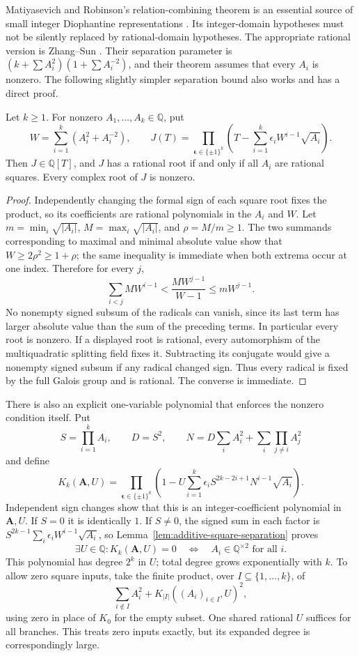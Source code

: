Matiyasevich and Robinson's relation-combining theorem is an essential
source of small integer Diophantine representations
\cite{MatiyasevichRobinson1975,Jones1982}. Its integer-domain hypotheses
must not be silently replaced by rational-domain hypotheses. The
appropriate rational version is Zhang--Sun
\cite[Theorem 1.2]{ZhangSun2022}. Their separation parameter is
$(k+\sum A_i^2)(1+\sum A_i^{-2})$, and their theorem assumes that every
$A_i$ is nonzero. The following slightly simpler separation bound also
works and has a direct proof.

\begin{lemma}\label{lem:additive-square-separation}
Let $k\ge1$. For nonzero $A_1,\ldots,A_k\in\mathbb Q$, put
\[
 W=\sum_{i=1}^k(A_i^2+A_i^{-2}),\qquad
 J(T)=\prod_{\boldsymbol\epsilon\in\{\pm1\}^k}
 \left(T-\sum_{i=1}^k\epsilon_i W^{i-1}\sqrt{A_i}\right).
\]
Then $J\in\mathbb Q[T]$, and $J$ has a rational root if and only if
all $A_i$ are rational squares. Every complex root of $J$ is nonzero.
\end{lemma}
\begin{proof}
Independently changing the formal sign of each square root fixes the
product, so its coefficients are rational polynomials in the $A_i$ and
$W$. Let
$m=\min_i\sqrt{|A_i|}$, $M=\max_i\sqrt{|A_i|}$, and $\rho=M/m\ge1$.
The two summands corresponding to maximal and minimal absolute value
show that $W\ge2\rho^2\ge1+\rho$; the same inequality is immediate
when both extrema occur at one index. Therefore for every $j$,
\[
 \sum_{i<j}M W^{i-1}<\frac{M W^{j-1}}{W-1}
 \le mW^{j-1}.
\]
No nonempty signed subsum of the radicals can vanish, since its last
term has larger absolute value than the sum of the preceding terms.
In particular every root is nonzero. If a displayed root is rational,
every automorphism of the multiquadratic splitting field fixes it.
Subtracting its conjugate would give a nonempty signed subsum if any
radical changed sign. Thus every radical is fixed by the full Galois
group and is rational. The converse is immediate.
\end{proof}

There is also an explicit one-variable polynomial that enforces the
nonzero condition itself. Put
\[
 S=\prod_{i=1}^k A_i,\qquad D=S^2,\qquad
 N=D\sum_i A_i^2+\sum_i\prod_{j\ne i}A_j^2
\]
and define
\[
 K_k(\mathbf A,U)=\prod_{\boldsymbol\epsilon\in\{\pm1\}^k}
 \left(1-U\sum_{i=1}^k\epsilon_i
 S^{2k-2i+1}N^{i-1}\sqrt{A_i}\right).
\]
Independent sign changes show that this is an integer-coefficient
polynomial in $\mathbf A,U$. If $S=0$ it is identically $1$.
If $S\ne0$, the signed sum in each factor is
$S^{2k-1}\sum_i\epsilon_iW^{i-1}\sqrt{A_i}$, so
Lemma~\ref{lem:additive-square-separation} proves
\[
 \exists U\in\mathbb Q:K_k(\mathbf A,U)=0
 \quad\Longleftrightarrow\quad
 A_i\in\mathbb Q^{\times2}\text{ for all }i.
\]
This polynomial has degree $2^k$ in $U$; total degree grows
exponentially with $k$. To allow zero square inputs, take the finite
product, over $I\subseteq\{1,\ldots,k\}$, of
\[
 \sum_{i\notin I}A_i^2+K_{|I|}((A_i)_{i\in I},U)^2,
\]
using zero in place of $K_0$ for the empty subset. One shared rational
$U$ suffices for all branches. This treats zero inputs exactly, but its
expanded degree is correspondingly large.

